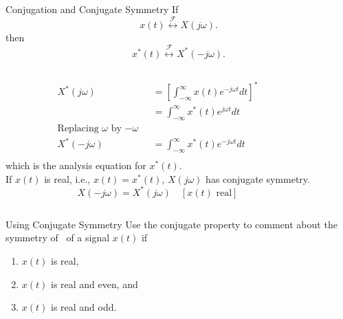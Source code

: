 \begin{frame}{Conjugation and Conjugate Symmetry}
    If
    \begin{equation*}
        x(t)  \overset{\mathcal{F}}{\longleftrightarrow}  X(j\omega).
    \end{equation*}
    then
    \begin{equation*}
        x^\ast(t)  \overset{\mathcal{F}}{\longleftrightarrow}  X^\ast(-j\omega).
    \end{equation*}
    \pause
    {
        \begin{columns}
                \begin{align*}
                    X^\ast(j\omega) &= \left[\int_{-\infty}^{\infty}x(t)e^{-j\omega t} dt \right]^\ast\\
                    &= \int_{-\infty}^{\infty}x^\ast(t)e^{j\omega t} dt\\
                    \text{Replacing $\omega$ by $-\omega$ }\\
                    X^\ast(-j\omega) &= \int_{-\infty}^{\infty}x^\ast(t)e^{-j\omega t} dt\\
                \end{align*}
                which is the analysis equation for $x^\ast(t)$.\\
                \pause
                If $x(t)$ is real, i.e., $x(t) = x^\ast(t)$, $X(j\omega)$ has conjugate symmetry.
                \begin{equation*}
                    X(-j\omega) = X^\ast(j\omega)\quad [x(t) \text{ real}]
                \end{equation*}

        \end{columns}



    }


\end{frame}

\begin{frame}{Using Conjugate Symmetry}
    Use the conjugate property to comment about the symmetry of \ft~of a signal $x(t)$ if
    \begin{enumerate}
        \item $x(t)$ is real,
        \item $x(t)$ is real and even, and
        \item $x(t)$ is real and odd.
    \end{enumerate}
\end{frame}

